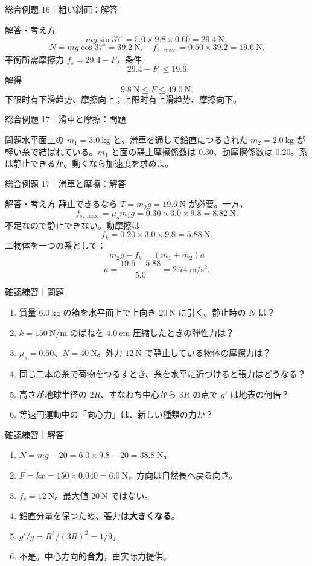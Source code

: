 \documentclass[notheorems,aspectratio=169]{beamer}
\newcommand{\key}[1]{\textbf{\color{ChinaRed}#1}}
\newcommand{\qcard}[1]{%
  \begin{block}{問題}\centering\large #1\end{block}}
\newcommand{\acard}[1]{%
  \begin{exampleblock}{解答・考え方}#1\end{exampleblock}}
\begin{document}
\begin{frame}{総合例題 16｜粗い斜面：解答}
\small
\acard{
\[
mg\sin37^\circ=5.0\times9.8\times0.60=29.4\ \mathrm N,
\]
\[
N=mg\cos37^\circ=39.2\ \mathrm N,
\quad f_{s,\max}=0.50\times39.2=19.6\ \mathrm N.
\]
平衡所需摩擦力 $f_s=29.4-F$，条件
\[
|29.4-F|\le19.6.
\]
解得
\[
\boxed{9.8\ \mathrm N\le F\le49.0\ \mathrm N}.
\]
下限时有下滑趋势、摩擦向上；上限时有上滑趋势、摩擦向下。}
\end{frame}

\begin{frame}{総合例題 17｜滑車と摩擦：問題}
\vfill
\qcard{水平面上の $m_1=3.0\ \mathrm{kg}$ と、滑車を通して鉛直につるされた $m_2=2.0\ \mathrm{kg}$ が軽い糸で結ばれている。$m_1$ と面の静止摩擦係数は $0.30$、動摩擦係数は $0.20$。系は静止できるか。動くなら加速度を求めよ。}
\vfill
\end{frame}

\begin{frame}{総合例題 17｜滑車と摩擦：解答}
\small
\acard{
静止できるなら $T=m_2g=19.6\ \mathrm N$ が必要。一方，
\[
f_{s,\max}=\mu_sm_1g=0.30\times3.0\times9.8=8.82\ \mathrm N.
\]
不足なので静止できない。動摩擦は
\[
f_k=0.20\times3.0\times9.8=5.88\ \mathrm N.
\]
二物体を一つの系として：
\[
m_2g-f_k=(m_1+m_2)a
\]
\[
a=\frac{19.6-5.88}{5.0}=\boxed{2.74\ \mathrm{m/s^2}}.
\]}
\end{frame}

\begin{frame}{確認練習｜問題}
\small
\begin{enumerate}
  \item 質量 $6.0\ \mathrm{kg}$ の箱を水平面上で上向き $20\ \mathrm N$ に引く。静止時の $N$ は？
  \item $k=150\ \mathrm{N/m}$ のばねを $4.0\ \mathrm{cm}$ 圧縮したときの弾性力は？
  \item $\mu_s=0.50$、$N=40\ \mathrm N$。外力 $12\ \mathrm N$ で静止している物体の摩擦力は？
  \item 同じ二本の糸で荷物をつるすとき、糸を水平に近づけると張力はどうなる？
  \item 高さが地球半径の $2R$、すなわち中心から $3R$ の点で $g'$ は地表の何倍？
  \item 等速円運動中の「向心力」は、新しい種類の力か？
\end{enumerate}
\end{frame}

\begin{frame}{確認練習｜解答}
\small
\begin{enumerate}
  \item $N=mg-20=6.0\times9.8-20=\boxed{38.8\ \mathrm N}$。
  \item $F=kx=150\times0.040=\boxed{6.0\ \mathrm N}$，方向は自然長へ戻る向き。
  \item $f_s=\boxed{12\ \mathrm N}$。最大値 $20\ \mathrm N$ ではない。
  \item 鉛直分量を保つため、張力は\key{大きくなる}。
  \item $g'/g=R^2/(3R)^2=\boxed{1/9}$。
  \item 不是。中心方向的\key{合力}，由实际力提供。
\end{enumerate}
\end{frame}
\end{document}
